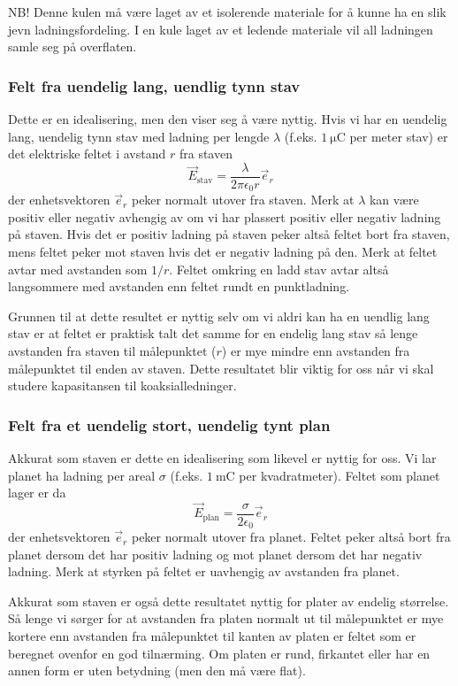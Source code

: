 \documentclass[a4paper,norsk,12pt]{article}
\begin{document}
NB! Denne kulen må være laget av et isolerende materiale for å kunne ha en slik jevn ladningsfordeling. I en kule laget av et ledende materiale vil all ladningen samle seg på overflaten.

\subsubsection*{Felt fra uendelig lang, uendlig tynn stav}
Dette er en idealisering, men den viser seg å være nyttig. Hvis vi har en uendelig lang, uendelig tynn stav med ladning per lengde $\lambda$ (f.eks. $1~\mathrm{\mu C}$ per meter stav) er det elektriske feltet i avstand $r$ fra staven
\begin{displaymath}
	\vec{E}_\text{stav} = \frac{\lambda}{2\pi\epsilon_0r}\vec{e}_r
\end{displaymath}
der enhetsvektoren $\vec{e}_r$ peker normalt utover fra staven. Merk at $\lambda$ kan være positiv eller negativ avhengig av om vi har plassert positiv eller negativ ladning på staven. Hvis det er positiv ladning på staven peker altså feltet bort fra staven, mens feltet peker mot staven hvis det er negativ ladning på den. Merk at feltet avtar med avstanden som $1/r$. Feltet omkring en ladd stav avtar altså langsommere med avstanden enn feltet rundt en punktladning.

Grunnen til at dette resultet er nyttig selv om vi aldri kan ha en uendlig lang stav er at feltet er praktisk talt det samme for en endelig lang stav så lenge avstanden fra staven til målepunktet ($r$) er mye mindre enn avstanden fra målepunktet til enden av staven. Dette resultatet blir viktig for oss når vi skal studere kapasitansen til koaksialledninger.

\subsubsection*{Felt fra et uendelig stort, uendelig tynt plan}
Akkurat som staven er dette en idealisering som likevel er nyttig for oss. Vi lar planet ha ladning per areal $\sigma$ (f.eks. $1~\mathrm{mC}$ per kvadratmeter). Feltet som planet lager er da
\begin{displaymath}
	\vec{E}_\text{plan} = \frac{\sigma}{2\epsilon_0}\vec{e}_r
\end{displaymath}
der enhetsvektoren $\vec{e}_r$ peker normalt utover fra planet. Feltet peker altså bort fra planet dersom det har positiv ladning og mot planet dersom det har negativ ladning. Merk at styrken på feltet er uavhengig av avstanden fra planet.

Akkurat som staven er også dette resultatet nyttig for plater av endelig størrelse. Så lenge vi sørger for at avstanden fra platen normalt ut til målepunktet er mye kortere enn avstanden fra målepunktet til kanten av platen er feltet som er beregnet ovenfor en god tilnærming. Om platen er rund, firkantet eller har en annen form er uten betydning (men den må være flat).
\end{document}
